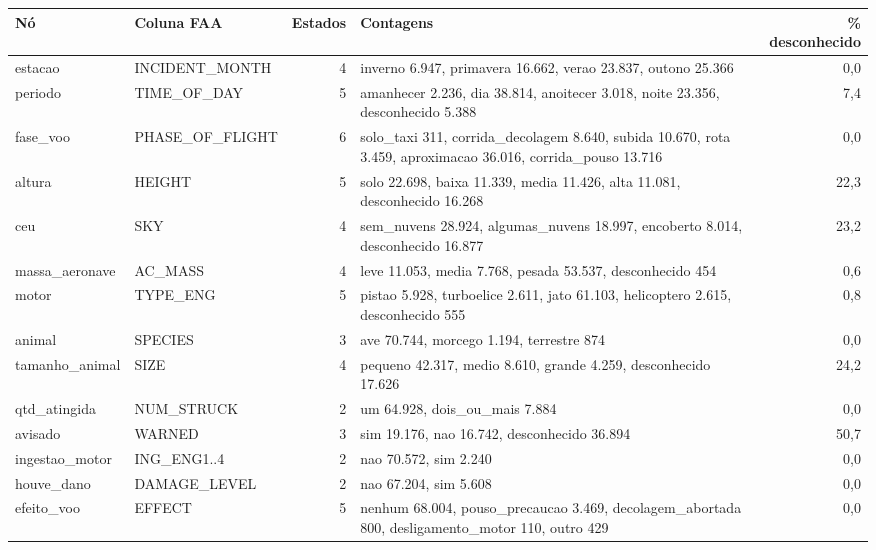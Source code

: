 \begin{tabular}{llrp{7.2cm}r}
\toprule
Nó & Coluna FAA & Estados & Contagens & \% desconhecido \\
\midrule
estacao & INCIDENT\_MONTH & 4 & inverno 6.947, primavera 16.662, verao 23.837, outono 25.366 & 0,0 \\
periodo & TIME\_OF\_DAY & 5 & amanhecer 2.236, dia 38.814, anoitecer 3.018, noite 23.356, desconhecido 5.388 & 7,4 \\
fase\_voo & PHASE\_OF\_FLIGHT & 6 & solo\_taxi 311, corrida\_decolagem 8.640, subida 10.670, rota 3.459, aproximacao 36.016, corrida\_pouso 13.716 & 0,0 \\
altura & HEIGHT & 5 & solo 22.698, baixa 11.339, media 11.426, alta 11.081, desconhecido 16.268 & 22,3 \\
ceu & SKY & 4 & sem\_nuvens 28.924, algumas\_nuvens 18.997, encoberto 8.014, desconhecido 16.877 & 23,2 \\
massa\_aeronave & AC\_MASS & 4 & leve 11.053, media 7.768, pesada 53.537, desconhecido 454 & 0,6 \\
motor & TYPE\_ENG & 5 & pistao 5.928, turboelice 2.611, jato 61.103, helicoptero 2.615, desconhecido 555 & 0,8 \\
animal & SPECIES & 3 & ave 70.744, morcego 1.194, terrestre 874 & 0,0 \\
tamanho\_animal & SIZE & 4 & pequeno 42.317, medio 8.610, grande 4.259, desconhecido 17.626 & 24,2 \\
qtd\_atingida & NUM\_STRUCK & 2 & um 64.928, dois\_ou\_mais 7.884 & 0,0 \\
avisado & WARNED & 3 & sim 19.176, nao 16.742, desconhecido 36.894 & 50,7 \\
ingestao\_motor & ING\_ENG1..4 & 2 & nao 70.572, sim 2.240 & 0,0 \\
houve\_dano & DAMAGE\_LEVEL & 2 & nao 67.204, sim 5.608 & 0,0 \\
efeito\_voo & EFFECT & 5 & nenhum 68.004, pouso\_precaucao 3.469, decolagem\_abortada 800, desligamento\_motor 110, outro 429 & 0,0 \\
\bottomrule
\end{tabular}
